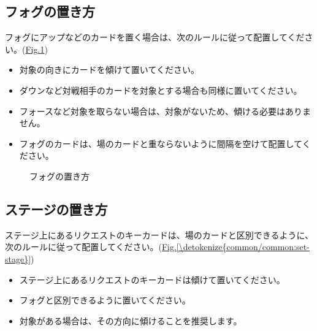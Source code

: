 \documentclass[letterpaper,10pt,dvipdfmx]{sphinxmanual}
\begin{document}
\subsection{フォグの置き方}
\label{\detokenize{common/common:id41}}
\sphinxAtStartPar
フォグにアップなどのカードを置く場合は、次のルールに従って配置してください。(\hyperref[\detokenize{common/common:set-fog}]{Fig.\@ \ref{\detokenize{common/common:set-fog}}})
\begin{itemize}
\item {} 
\sphinxAtStartPar
対象の向きにカードを傾けて置いてください。

\item {} 
\sphinxAtStartPar
ダウンなど対戦相手のカードを対象とする場合も同様に置いてください。

\item {} 
\sphinxAtStartPar
フォースなど対象を取らない場合は、対象がないため、傾ける必要はありません。

\item {} 
\sphinxAtStartPar
フォグのカードは、場のカードと重ならないように間隔を空けて配置してください。

\end{itemize}

\begin{figure}[htbp]
\centering
\capstart

\noindent{}
\caption{フォグの置き方}\label{\detokenize{common/common:id53}}\label{\detokenize{common/common:set-fog}}\end{figure}


\subsection{ステージの置き方}
\label{\detokenize{common/common:id42}}
\sphinxAtStartPar
ステージ上にあるリクエストのキーカードは、場のカードと区別できるように、次のルールに従って配置してください。(\hyperref[\detokenize{common/common:set-stage}]{Fig.\@ \ref{\detokenize{common/common:set-stage}}})
\begin{itemize}
\item {} 
\sphinxAtStartPar
ステージ上にあるリクエストのキーカードは傾けて置いてください。

\item {} 
\sphinxAtStartPar
フォグと区別できるように置いてください。

\item {} 
\sphinxAtStartPar
対象がある場合は、その方向に傾けることを推奨します。

\end{itemize}
\end{document}

